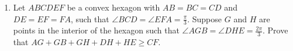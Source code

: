 \begin{enumerate}[label=\thesubsection.\arabic*,ref=\thesubsection.\theenumi]
\item Let $ABCDEF$ be a convex hexagon with $AB=BC=CD$ and $DE=EF=FA$, such that $\angle{BCD}=\angle{EFA}=\frac{\pi}{3}$. Suppose $G$ and $H$ are points in the interior of the hexagon such that $\angle{AGB}=\angle{DHE}=\frac{2\pi}{3}$. Prove that $AG+GB+GH+DH+HE\geq CF$.


\end{enumerate}
